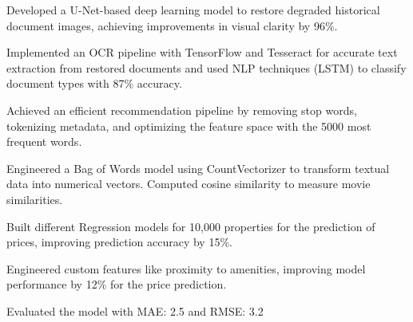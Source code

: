 \documentclass[]{deedy-resume-openfont}
\begin{document}
\begin{minipage}[t]{0.66\textwidth}
\begin{tightemize}
\end{tightemize}
\sectionsep

\begin{tightemize}
\item Developed a U-Net-based deep learning model to restore degraded historical document images, achieving improvements in visual clarity by 96\%. \item Implemented an OCR pipeline with TensorFlow and Tesseract for accurate text extraction from restored documents and used NLP techniques
(LSTM) to classify document types with 87\% accuracy.
\end{tightemize}
\sectionsep

\begin{tightemize}
\item Achieved an efficient recommendation pipeline by removing stop words, tokenizing metadata, and optimizing the feature space with the 5000 most frequent words.
\item Engineered a Bag of Words model using CountVectorizer to transform textual data into numerical vectors. Computed cosine similarity to measure movie similarities.
\end{tightemize}
\sectionsep

\begin{tightemize}
\item Built different Regression models for 10,000 properties for the
prediction of prices, improving prediction accuracy by 15\%.
\item Engineered custom features like proximity to amenities, improving
model performance by 12\% for the price prediction.
\item Evaluated the model with MAE: 2.5 and RMSE: 3.2
\end{tightemize}
\sectionsep




\renewcommand\refname{\vskip -1.5em} %


\nocite{*}

\end{minipage} 
\end{document}
